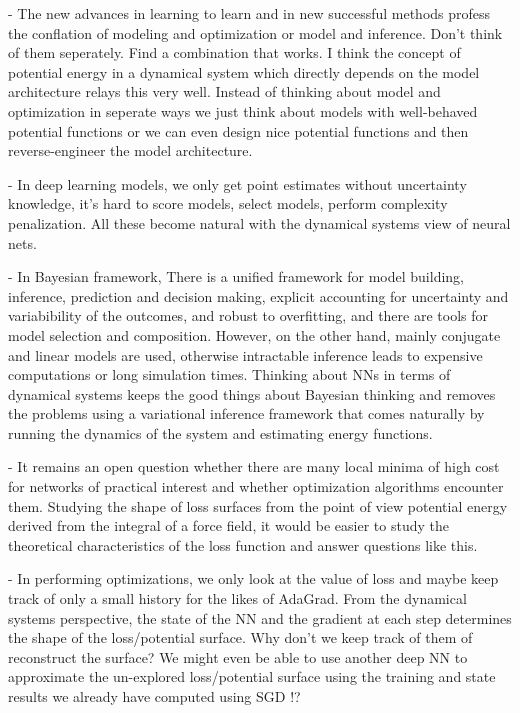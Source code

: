 \documentclass[aps,preprint,showpacs,superscriptaddress,groupedaddress]{revtex4}  %
\begin{document}
- The new advances in learning to learn and in new successful methods profess the conflation of modeling and optimization or model and inference. Don't think of them seperately. Find a combination that works. I think the concept of potential energy in a dynamical system which directly depends on the model architecture relays this very well. Instead of thinking about model and optimization in seperate ways we just think about models with well-behaved potential functions or we can even design nice potential functions and then reverse-engineer the model architecture. 

- In deep learning models, we only get point estimates without uncertainty knowledge, it's hard to score models, select models, perform complexity penalization. All these become natural with the dynamical systems view of neural nets. 

- In Bayesian framework, There is a unified framework for model building, inference, prediction and decision making, explicit accounting for uncertainty and variabibility of the outcomes, and robust to overfitting, and there are tools for model selection and composition. However, on the other hand, mainly conjugate and linear models are used, otherwise intractable inference leads to expensive computations or long simulation times. Thinking about NNs in terms of dynamical systems keeps the good things about Bayesian thinking and removes the problems using a variational inference framework that comes naturally by running the dynamics of the system and estimating energy functions. 

- It remains an open question whether there are many local minima of high cost for networks of practical interest and whether optimization algorithms encounter them. Studying the shape of loss surfaces from the point of view potential energy derived from the integral of a force field, it would be easier to study the theoretical characteristics of the loss function and answer questions like this.

- In performing optimizations, we only look at the value of loss and maybe keep track of only a small history for the likes of AdaGrad. From the dynamical systems perspective, the state of the NN and the gradient at each step determines the shape of the loss/potential surface. Why don't we keep track of them of reconstruct the surface? We might even be able to use another deep NN to approximate the un-explored loss/potential surface using the training and state results we already have computed using SGD !?
\end{document}
